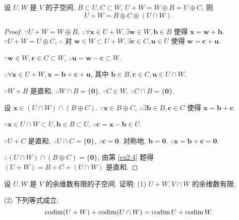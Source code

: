 \documentclass[color=black,device=normal,lang=cn,mode=geye]{elegantnote}
\begin{document}
\begin{lemma}\label{l4.3}
    设 $U,W$ 是 $V$ 的子空间, $B\subset U,C\subset W$, $U+W=W\oplus B=U\oplus C$, 则
    \[U+W=B\oplus C\oplus(U\cap W).\]
\end{lemma}
\begin{proof}
    $\because U+W=W\oplus B$, $\therefore\forall\boldsymbol{x}\in U+W,\exists\boldsymbol{w}\in W,\boldsymbol{b}\in B$ 使得 $\boldsymbol{x}=\boldsymbol{w}+\boldsymbol{b}$. $\because U+W=U\oplus C$, $\therefore$ 对 $\boldsymbol{w}\in W\subset U+W,\exists\boldsymbol{c}\in C,\boldsymbol{u}\in U$ 使得 $\boldsymbol{w}=\boldsymbol{c}+\boldsymbol{u}$.

    $\because\boldsymbol{w}\in W,\boldsymbol{c}\in C\subset W$, $\therefore\boldsymbol{u}=\boldsymbol{w}-\boldsymbol{c}\subset W$.
    
    $\therefore\forall\boldsymbol{x}\in U+W,\boldsymbol{x}=\boldsymbol{b}+\boldsymbol{c}+\boldsymbol{u}$, 其中 $\boldsymbol{b}\in B,\boldsymbol{c}\in C,\boldsymbol{u}\in U\cap W$.

    $\because W+B$ 是直和, $\therefore W\cap B=\{\boldsymbol{0}\}$. $\because C\in W$, $\therefore C\cap B=\{\boldsymbol{0}\}$.

    设 $\boldsymbol{x}\in(U\cap W)\cap(B\oplus C)$. $\because\boldsymbol{x}\in B\oplus C$, $\therefore\exists\boldsymbol{b}\in B,\boldsymbol{c}\in C$ 使得 $\boldsymbol{x}=\boldsymbol{b}+\boldsymbol{c}$.

    $\because\boldsymbol{x}\in U\cap W\subset U,\boldsymbol{b}\in B\subset U$, $\therefore\boldsymbol{c}=\boldsymbol{x}-\boldsymbol{b}\in U$.
    
    $\because U+C$ 是直和, $\therefore U\cap C=\{\boldsymbol{0}\}$, $\therefore\boldsymbol{c}=\boldsymbol{0}$. 对称地, $\boldsymbol{b}=\boldsymbol{0}$. $\therefore\boldsymbol{x}=\boldsymbol{b}+\boldsymbol{c}=\boldsymbol{0}$.

    $\therefore(U\cap W)\cap(B\oplus C)=\{\boldsymbol{0}\}$, 由第 \ref{ex2.4} 题得 $(U+W)=B+C+(U\cap W)$ 是直和.
\end{proof}
\begin{exercise}\label{ex2.9}
    设 $U,W$ 是 $V$ 的余维数有限的子空间. 证明: (1) $U+W,V\cap W$ 的余维数有限;

    (2) 下列等式成立:
    \begin{equation}\label{eq4.2}
        \operatorname{codim}(U+W)+\operatorname{codim}(U\cap W)=\operatorname{codim} U+\operatorname{codim} W.
    \end{equation}
\end{exercise}
\end{document}

